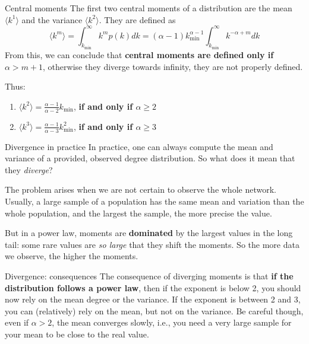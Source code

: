 \begin{textbox}{Central moments}
    The first two central moments of a distribution are the mean $\langle k^1 \rangle $ and the variance $\langle k^2 \rangle $. They are defined as
    \[
        \langle k^m \rangle = \int_{k_{\min}}^{\infty}k^mp(k)dk=(\alpha-1)k^{\alpha-1}_{\min}\int_{k_{\min}}^{\infty}k^{-\alpha+m}dk
    \]
    From this, we can conclude that \textbf{central moments are defined only if $\alpha>m+1$}, otherwise they diverge towards infinity, they are not properly defined.

    Thus:
    \begin{enumerate}
        \item $\langle k^2 \rangle = \frac{\alpha-1}{\alpha-2}k_{\min}$, \textbf{if and only if $\alpha\geq 2$}
        \item $\langle k^3 \rangle = \frac{\alpha-1}{\alpha-3}k^2_{\min}$, \textbf{if and only if $\alpha\geq 3$}
    \end{enumerate}
\end{textbox}


\begin{textbox}{Divergence in practice}
    In practice, one can always compute the mean and variance of a provided, observed degree distribution. So what does it mean that they \textit{diverge}?

    The problem arises when we are not certain to observe the whole network. Usually, a large sample of a population has the same mean and variation than the whole population, and the largest the sample, the more precise the value.

    But in a power law, moments are \textbf{dominated} by the largest values in the long tail: some rare values are \textit{so large} that they shift the moments. So the more data we observe, the higher the moments.
\end{textbox}


\begin{textbox}{Divergence: consequences}
    The consequence of diverging moments is that \textbf{if the distribution follows a power law}, then if the exponent is below 2, you should now rely on the mean degree or the variance. If the exponent is between 2 and 3, you can (relatively) rely on the mean, but not on the variance. Be careful though, even if $\alpha>2$, the mean converges slowly, i.e., you need a very large sample for your mean to be close to the real value.
\end{textbox}


